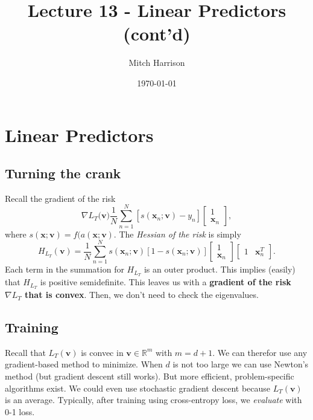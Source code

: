 \documentclass[titlepage, 12pt, leqno]{article}
\title{\Huge{Lecture 13 - Linear Predictors (cont'd)}}
\author{\large{Mitch Harrison}}
\date{\today}
\begin{document}
\setlength{\parskip}{1\baselineskip}
\setlength{\parindent}{15pt}
\maketitle
\tableofcontents
\newpage


\section{Linear Predictors}

\subsection{Turning the crank}
Recall the gradient of the risk
\[
\nabla L_{T}(\textbf{v)}\frac{1}{N}\sum_{n=1}^{N}
[s(\textbf{x}_{n};\textbf{v})-y_{n}]
    \begin{bmatrix}
    1\\ 
    \textbf{x}_{n}
    \end{bmatrix},
\]
where $s(\textbf{x};\textbf{v}) = f(a(\textbf{x};\textbf{v})$. The 
\textit{Hessian of the risk }is simply
\[
H_{L_{T}}(\textbf{v}) = \frac{1}{N}\sum_{n=1}^{N}s(\textbf{x}_{n};\textbf{v})
[1-s(\textbf{x}_{n};\textbf{v})]
\begin{bmatrix}
1\\ 
\textbf{x}_{n}
\end{bmatrix}
\begin{bmatrix}
1 & \textbf{x}_{n}^{T}
\end{bmatrix}.
\]
Each term in the summation for $H_{L_{T}}$ is an outer product. This implies 
(easily) that $H_{L_{T}}$ is positive semidefinite. This leaves us with a
\textbf{gradient of the risk $\nabla L_{T}$ that is convex}. Then, we don't need 
to check the eigenvalues.

\subsection{Training}
Recall that $L_{T}(\textbf{v})$ is convec in $\textbf{v}\in \mathbb{R}^{m}$ with
$m=d+1$. We can therefor use any gradient-based method to minimize. When $d$ is 
not too large we can use Newton's method (but gradient descent still works). But
more efficient, problem-specific algorithms exist. We could even use stochastic
gradient descent because $L_{T}(\textbf{v})$ is an average. Typically, after
training using cross-entropy loss, we \textit{evaluate} with 0-1 loss.
\end{document}
